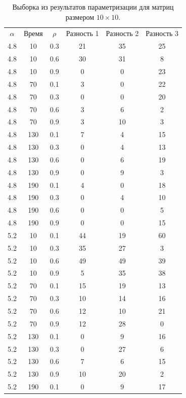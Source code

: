 \documentclass[12pt]{report}
\begin{document}
\begin{table}[H]

	\caption{Выборка из результатов параметризации для матриц размером $10\times10$.}
	\label{tab:8}
	\begin{center}

		\begin{tabular}{|c@{\hspace{7mm}}|c@{\hspace{7mm}}|c@{\hspace{7mm}}|c|c|c|}

			\hline
			$\alpha$        & Время      & $\rho$      &Разность 1    &Разность 2    &Разность 3\\
			
4.8 & 10 & 0.3 & 21 & 35 & 25 \\
4.8 & 10 & 0.6 & 30 & 31 & 8 \\
4.8 & 10 & 0.9 & 0 & 0 & 23 \\
4.8 & 70 & 0.1 & 3 & 0 & 22 \\
4.8 & 70 & 0.3 & 0 & 0 & 20 \\
4.8 & 70 & 0.6 & 3 & 6 & 2 \\
4.8 & 70 & 0.9 & 3 & 10 & 3 \\
4.8 & 130 & 0.1 & 7 & 4 & 15 \\
4.8 & 130 & 0.3 & 0 & 4 & 13 \\
4.8 & 130 & 0.6 & 0 & 6 & 19 \\
4.8 & 130 & 0.9 & 0 & 9 & 3 \\
4.8 & 190 & 0.1 & 4 & 0 & 18 \\
4.8 & 190 & 0.3 & 0 & 4 & 10 \\
4.8 & 190 & 0.6 & 0 & 0 & 5 \\
4.8 & 190 & 0.9 & 0 & 0 & 15 \\
5.2 & 10 & 0.1 & 44 & 19 & 60 \\
5.2 & 10 & 0.3 & 35 & 27 & 3 \\
5.2 & 10 & 0.6 & 49 & 49 & 39 \\
5.2 & 10 & 0.9 & 5 & 35 & 38 \\
5.2 & 70 & 0.1 & 15 & 19 & 13 \\
5.2 & 70 & 0.3 & 10 & 14 & 16 \\
5.2 & 70 & 0.6 & 12 & 10 & 21 \\
5.2 & 70 & 0.9 & 12 & 28 & 0 \\
5.2 & 130 & 0.1 & 0 & 9 & 16 \\
5.2 & 130 & 0.3 & 0 & 27 & 6 \\
5.2 & 130 & 0.6 & 7 & 6 & 15 \\
5.2 & 130 & 0.9 & 10 & 20 & 2 \\
5.2 & 190 & 0.1 & 0 & 9 & 17 \\

\hline
		\end{tabular}
	\end{center}
\end{table}
\end{document}
